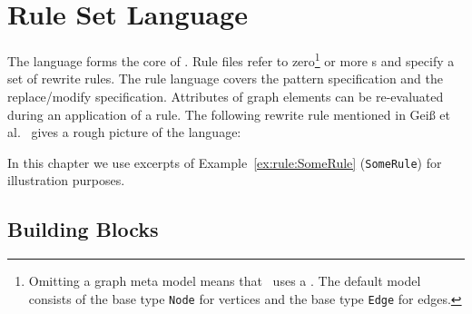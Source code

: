 \chapter{Rule Set Language}
\label{chaprulelang}

The  language forms the core of \GrG. Rule files refer to zero\footnote{Omitting a graph meta model means that \GrG\ uses a . The default model consists of the base type \texttt{Node} for vertices and the base type \texttt{Edge} for edges.} or more s and specify a set of rewrite rules. The rule language covers the pattern specification and the replace/modify specification. Attributes of graph elements can be re-evaluated during an application of a rule. The following rewrite rule mentioned in Geiß et al.~\cite{GBGHS:06} gives a rough picture of the language:
\begin{example}\label{ex:rule:SomeRule}
\end{example}
In this chapter we use excerpts of Example~\ref{ex:rule:SomeRule} (\texttt{SomeRule}) for illustration purposes.

\section{Building Blocks}
\label{rulebb}

